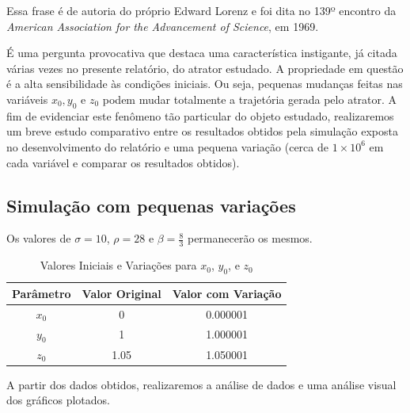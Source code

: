 \documentclass[12pt, a4paper]{article}
\begin{document}
    Essa frase é de autoria do próprio Edward Lorenz e foi dita no 139º
    encontro da \textit{American Association for the Advancement of Science}, em
    1969.
    
    É uma pergunta provocativa que destaca uma característica instigante, já
    citada várias vezes no presente relatório, do atrator estudado. A propriedade
    em questão é a alta sensibilidade às condições iniciais. Ou seja, pequenas
    mudanças feitas nas variáveis $x_0, y_0$ e $z_0$ podem mudar totalmente a
    trajetória gerada pelo atrator. A fim de evidenciar este fenômeno tão
    particular do objeto estudado, realizaremos um breve estudo comparativo entre
    os resultados obtidos pela simulação exposta no desenvolvimento do relatório e
    uma pequena variação (cerca de $1 \times 10^6$ em cada variável e comparar os
    resultados obtidos).
    
    \subsection{Simulação com pequenas variações}
    
    Os valores de $\sigma=10$, $\rho = 28$ e $\beta = \frac{8}{3}$ permanecerão
    os mesmos.
    
    \begin{table}[htbp]
        \centering
        \caption{Valores Iniciais e Variações para \(x_0\), \(y_0\), e \(z_0\)}
        \begin{tabular}{|c|c|c|}
            \hline
            Parâmetro & Valor Original & Valor com Variação \\
            \hline
            $x_0$     & 0              & 0.000001           \\ \hline
            $y_0$     & 1              & 1.000001           \\ \hline
            $z_0$     & 1.05           & 1.050001           \\ \hline
        \end{tabular}
    \end{table}
    
    A partir dos dados obtidos, realizaremos a análise de dados e uma análise
    visual dos gráficos plotados.
    
    \newpage
\end{document}
